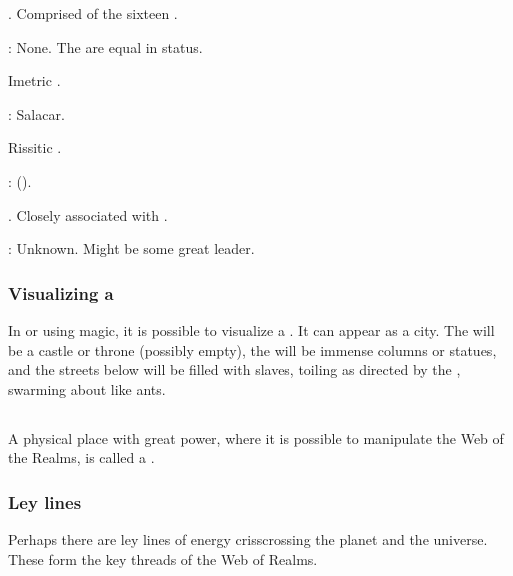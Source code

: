 \begin{gloss}
  
  
    \Iquinian{} \nexus.
    Comprised of the sixteen \sephiroth. 
    
    \Apex: 
    None. The \sephiroth{} are equal in status. 
  
    Imetric \nexus. 
    
    \Apex: 
    Salacar. 
  
    Rissitic \nexus. 
    
    \Apex: 
    \HriistN{} (\Secherdamon). 
  
    \Vorcanth{} \nexus.
    Closely associated with . 
    
    \Apex: 
    Unknown. 
    Might be some great \vorcanth{} leader. 
\end{gloss}





\subsubsection{Visualizing a \nexus}
In  or using magic, it is possible to visualize a \nexus{}. It can appear as a city. The \apex{} will be a castle or throne (possibly empty), the \vertices{} will be immense columns or statues, and the streets below will be filled with slaves, toiling as directed by the \vertices, swarming about like ants. 










\subsection{\Nexus}
\index{\nexus}
A physical place with great power, where it is possible to manipulate the Web of the Realms, is called a \nexus. 





\subsubsection{Ley lines}
Perhaps there are ley lines of \nexus{} energy crisscrossing the planet and the universe. These form the key threads of the Web of Realms. 

